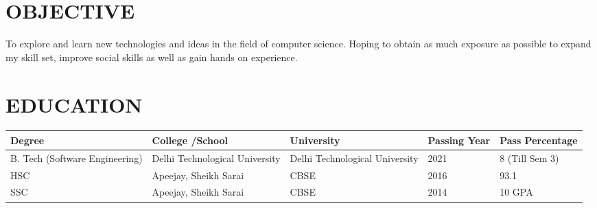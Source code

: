 \documentclass[margin]{res}
\begin{document}
\begin{resume}
 \section{OBJECTIVE} To explore and learn new technologies and ideas in the field of computer science. Hoping to obtain as much exposure as possible to expand my skill set, improve social skills as well as gain hands on experience. \\

\section{EDUCATION}\begin{tabu} to 1\textwidth { | X[c] | X[c] | X[c] | X[c]| X[c]|}
 \hline
 Degree & College /School & University & Passing Year & Pass Percentage\\
 \hline
 B. Tech (Software Engineering) & Delhi Technological University &Delhi Technological University & 2021 & 8 (Till Sem 3) \\
\hline
HSC & Apeejay, Sheikh Sarai & CBSE & 2016 & 93.1\\
\hline
SSC & Apeejay, Sheikh Sarai & CBSE & 2014 & 10 GPA\\
\hline
\end{tabu}


\end{resume}
\end{document}
